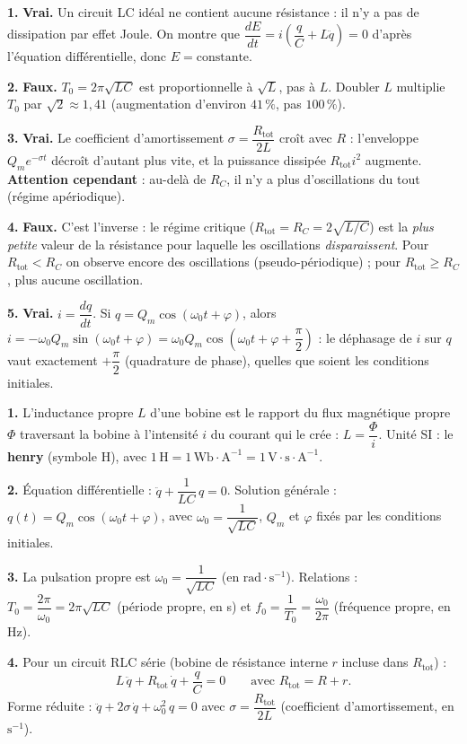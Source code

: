 \documentclass[11pt]{article}
\newcommand{\cle}[1]{{\popxbold\color{popdark}#1}}
\begin{document}
\begin{corrige}
\textbf{1.} \textbf{Vrai.} Un circuit LC idéal ne contient aucune résistance : il n'y a pas de dissipation par effet Joule. On montre que $\dfrac{dE}{dt} = i\left(\dfrac{q}{C} + L\ddot{q}\right) = 0$ d'après l'équation différentielle, donc $E = \text{constante}$.

\textbf{2.} \textbf{Faux.} $T_0 = 2\pi\sqrt{LC}$ est proportionnelle à $\sqrt{L}$, pas à $L$. Doubler $L$ multiplie $T_0$ par $\sqrt{2} \approx 1,41$ (augmentation d'environ $41\,\%$, pas $100\,\%$).

\textbf{3.} \textbf{Vrai.} Le coefficient d'amortissement $\sigma = \dfrac{R_{\text{tot}}}{2L}$ croît avec $R$ : l'enveloppe $Q_m e^{-\sigma t}$ décroît d'autant plus vite, et la puissance dissipée $R_{\text{tot}}i^2$ augmente. \textbf{Attention cependant} : au-delà de $R_C$, il n'y a plus d'oscillations du tout (régime apériodique).

\textbf{4.} \textbf{Faux.} C'est l'inverse : le régime critique ($R_{\text{tot}} = R_C = 2\sqrt{L/C}$) est la \emph{plus petite} valeur de la résistance pour laquelle les oscillations \emph{disparaissent}. Pour $R_{\text{tot}} < R_C$ on observe encore des oscillations (pseudo-périodique) ; pour $R_{\text{tot}} \geq R_C$, plus aucune oscillation.

\textbf{5.} \textbf{Vrai.} $i = \dfrac{dq}{dt}$. Si $q = Q_m\cos(\omega_0 t + \varphi)$, alors $i = -\omega_0 Q_m\sin(\omega_0 t + \varphi) = \omega_0 Q_m\cos\!\left(\omega_0 t + \varphi + \dfrac{\pi}{2}\right)$ : le déphasage de $i$ sur $q$ vaut exactement $+\dfrac{\pi}{2}$ (quadrature de phase), quelles que soient les conditions initiales.
\end{corrige}

\begin{corrige}
\textbf{1.} L'\cle{inductance propre} $L$ d'une bobine est le rapport du flux magnétique propre $\Phi$ traversant la bobine à l'intensité $i$ du courant qui le crée : $L = \dfrac{\Phi}{i}$. Unité SI : le \textbf{henry} (symbole H), avec $1\,\text{H} = 1\,\text{Wb}\cdot\text{A}^{-1} = 1\,\text{V}\cdot\text{s}\cdot\text{A}^{-1}$.

\textbf{2.} Équation différentielle : $\ddot{q} + \dfrac{1}{LC}\,q = 0$. Solution générale : $q(t) = Q_m\cos(\omega_0 t + \varphi)$, avec $\omega_0 = \dfrac{1}{\sqrt{LC}}$, $Q_m$ et $\varphi$ fixés par les conditions initiales.

\textbf{3.} La \cle{pulsation propre} est $\omega_0 = \dfrac{1}{\sqrt{LC}}$ (en $\text{rad}\cdot\text{s}^{-1}$). Relations : $T_0 = \dfrac{2\pi}{\omega_0} = 2\pi\sqrt{LC}$ (période propre, en s) et $f_0 = \dfrac{1}{T_0} = \dfrac{\omega_0}{2\pi}$ (fréquence propre, en Hz).

\textbf{4.} Pour un circuit RLC série (bobine de résistance interne $r$ incluse dans $R_{\text{tot}}$) :
\[
L\,\ddot{q} + R_{\text{tot}}\,\dot{q} + \frac{q}{C} = 0 \qquad\text{avec } R_{\text{tot}} = R + r.
\]
Forme réduite : $\ddot{q} + 2\sigma\,\dot{q} + \omega_0^2\,q = 0$ avec $\sigma = \dfrac{R_{\text{tot}}}{2L}$ (coefficient d'amortissement, en $\text{s}^{-1}$).
\end{corrige}
\end{document}
